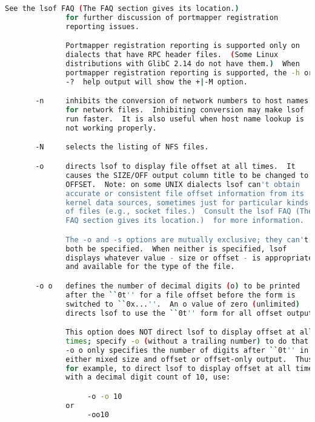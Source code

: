 {{\begin{lstlisting}[language=bash]
              See the lsof FAQ (The FAQ section gives its location.)
              for further discussion of portmapper registration
              reporting issues.

              Portmapper registration reporting is supported only on
              dialects that have RPC header files.  (Some Linux
              distributions with GlibC 2.14 do not have them.)  When
              portmapper registration reporting is supported, the -h or
              -?  help output will show the +|-M option.

       -n     inhibits the conversion of network numbers to host names
              for network files.  Inhibiting conversion may make lsof
              run faster.  It is also useful when host name lookup is
              not working properly.

       -N     selects the listing of NFS files.

       -o     directs lsof to display file offset at all times.  It
              causes the SIZE/OFF output column title to be changed to
              OFFSET.  Note: on some UNIX dialects lsof can't obtain
              accurate or consistent file offset information from its
              kernel data sources, sometimes just for particular kinds
              of files (e.g., socket files.)  Consult the lsof FAQ (The
              FAQ section gives its location.)  for more information.

              The -o and -s options are mutually exclusive; they can't
              both be specified.  When neither is specified, lsof
              displays whatever value - size or offset - is appropriate
              and available for the type of the file.

       -o o   defines the number of decimal digits (o) to be printed
              after the ``0t'' for a file offset before the form is
              switched to ``0x...''.  An o value of zero (unlimited)
              directs lsof to use the ``0t'' form for all offset output.

              This option does NOT direct lsof to display offset at all
              times; specify -o (without a trailing number) to do that.
              -o o only specifies the number of digits after ``0t'' in
              either mixed size and offset or offset-only output.  Thus,
              for example, to direct lsof to display offset at all times
              with a decimal digit count of 10, use:

                   -o -o 10
              or
                   -oo10


\end{lstlisting}}}
